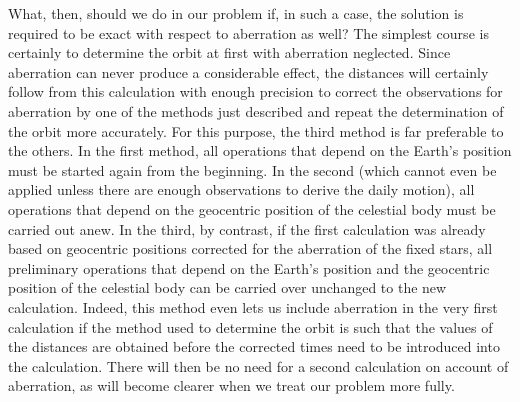 What, then, should we do in our problem if, in such a case, the solution is required to be exact with respect to aberration as well? The simplest course is certainly to determine the orbit at first with aberration neglected. Since aberration can never produce a considerable effect, the distances will certainly follow from this calculation with enough precision to correct the observations for aberration by one of the methods just described and repeat the determination of the orbit more accurately. For this purpose, the third method is far preferable to the others. In the first method, all operations that depend on the Earth's position must be started again from the beginning. In the second (which cannot even be applied unless there are enough observations to derive the daily motion), all operations that depend on the geocentric position of the celestial body must be carried out anew. In the third, by contrast, if the first calculation was already based on geocentric positions corrected for the aberration of the fixed stars, all preliminary operations that depend on the Earth's position and the geocentric position of the celestial body can be carried over unchanged to the new calculation. Indeed, this method even lets us include aberration in the very first calculation if the method used to determine the orbit is such that the values of the distances are obtained before the corrected times need to be introduced into the calculation. There will then be no need for a second calculation on account of aberration, as will become clearer when we treat our problem more fully.
